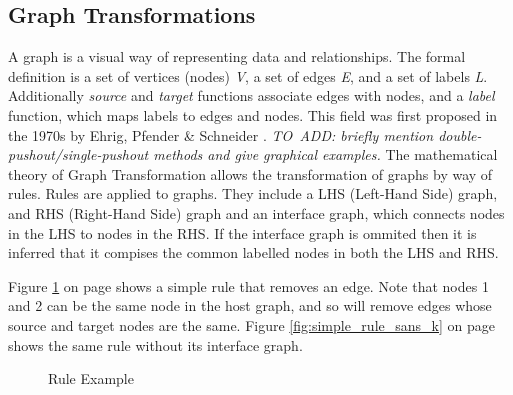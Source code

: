 \documentclass{UoYCSproject}
\begin{document}
\subsection{Graph Transformations}
A graph is a visual way of representing data and relationships. The formal definition is a set of vertices (nodes) \emph{V}, a set of edges \emph{E}, and a set of labels \emph{L}. Additionally \emph{source} and \emph{target} functions associate edges with nodes, and a \emph{label} function, which maps labels to edges and nodes.
This field was first proposed in the 1970s by Ehrig, Pfender \& Schneider \cite{grat_origin}.
\emph{TO~ADD: briefly mention double-pushout/single-pushout methods and give graphical examples.} %
The mathematical theory of Graph Transformation allows the transformation of graphs by way of rules. Rules are applied to graphs. They include a LHS (Left-Hand Side) graph, and RHS (Right-Hand Side) graph and an interface graph, which connects nodes in the LHS to nodes in the RHS. If the interface graph is ommited then it is inferred that it compises the common labelled nodes in both the LHS and RHS.

Figure \ref{fig:simple_rule} on page \pageref{fig:simple_rule} shows a simple rule that removes an edge. Note that nodes 1 and 2 can be the same node in the host graph, and so will remove edges whose source and target nodes are the same. Figure \ref{fig:simple_rule_sans_k} on page \pageref{fig:simple_rule_sans_k} shows the same rule without its interface graph.

\begin{figure}
\label{fig:simple_rule}
\centering
{}
\caption{Rule Example}
\end{figure}
\end{document}
